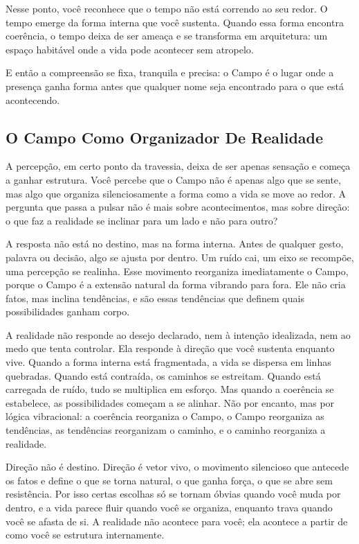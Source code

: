 \documentclass[12pt]{book}
\begin{document}
Nesse ponto, você reconhece que o tempo não está correndo ao seu redor. O tempo emerge da forma interna que você sustenta. Quando essa forma encontra coerência, o tempo deixa de ser ameaça e se transforma em arquitetura: um espaço habitável onde a vida pode acontecer sem atropelo.

E então a compreensão se fixa, tranquila e precisa: o Campo é o lugar onde a presença ganha forma antes que qualquer nome seja encontrado para o que está acontecendo.

\subsection*{O Campo Como Organizador De Realidade}

A percepção, em certo ponto da travessia, deixa de ser apenas sensação e começa a ganhar estrutura. Você percebe que o Campo não é apenas algo que se sente, mas algo que organiza silenciosamente a forma como a vida se move ao redor. A pergunta que passa a pulsar não é mais sobre acontecimentos, mas sobre direção: o que faz a realidade se inclinar para um lado e não para outro?

A resposta não está no destino, mas na forma interna. Antes de qualquer gesto, palavra ou decisão, algo se ajusta por dentro. Um ruído cai, um eixo se recompõe, uma percepção se realinha. Esse movimento reorganiza imediatamente o Campo, porque o Campo é a extensão natural da forma vibrando para fora. Ele não cria fatos, mas inclina tendências, e são essas tendências que definem quais possibilidades ganham corpo.

A realidade não responde ao desejo declarado, nem à intenção idealizada, nem ao medo que tenta controlar. Ela responde à direção que você sustenta enquanto vive. Quando a forma interna está fragmentada, a vida se dispersa em linhas quebradas. Quando está contraída, os caminhos se estreitam. Quando está carregada de ruído, tudo se multiplica em esforço. Mas quando a coerência se estabelece, as possibilidades começam a se alinhar. Não por encanto, mas por lógica vibracional: a coerência reorganiza o Campo, o Campo reorganiza as tendências, as tendências reorganizam o caminho, e o caminho reorganiza a realidade.

Direção não é destino. Direção é vetor vivo, o movimento silencioso que antecede os fatos e define o que se torna natural, o que ganha força, o que se abre sem resistência. Por isso certas escolhas só se tornam óbvias quando você muda por dentro, e a vida parece fluir quando você se organiza, enquanto trava quando você se afasta de si. A realidade não acontece para você; ela acontece a partir de como você se estrutura internamente.
\end{document}
